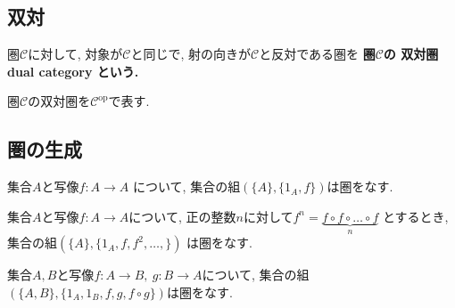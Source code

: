 \subsection{双対}
\begin{Def}
圏$\mathscr{C}$に対して, 対象が$\mathscr{C}$と同じで, 射の向きが$\mathscr{C}$と反対である圏を
\bf{圏$\mathscr{C}$の
双対圏 dual category
}という.
\end{Def}
\begin{Notation}
圏$\mathscr{C}$の双対圏を$\mathscr{C}^{\mathrm{op}}$で表す.
\end{Notation}
\begin{comment}
\begin{caution}
双対の原理
\end{caution}
\end{comment}
\subsection{圏の生成}
\begin{Prop}\label{Prop:generation category 0}
集合$A$と写像$f:A\rightarrow A$
について, 集合の組$(\{A\},\{1_A,f\})$は圏をなす.
\end{Prop}

\begin{Prop}\label{Prop:generation category 1}
集合$A$と写像$f:A\rightarrow A$について, 正の整数$n$に対して$f^n=\underbrace{f\circ f \circ \dots \circ f}_{n}$
とするとき,
集合の組$(\{A\},\{1_A,f,f^2,\dots,\})$
は圏をなす.
\end{Prop}

\begin{Prop}\label{Prop:generation category 2}
集合$A,B$と写像$f:A\rightarrow B,\ g:B\rightarrow A$について,
集合の組$(\{A,B\}, \{1_A,1_B,f,g,f\circ g\})$は圏をなす.
\end{Prop}

